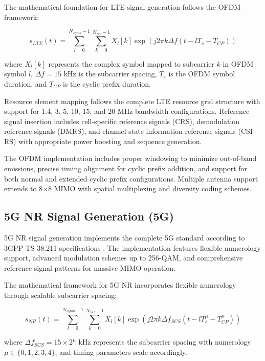 \documentclass[twocolumn]{article}
\begin{document}
The mathematical foundation for LTE signal generation follows the OFDM framework:

\begin{equation}
s_{LTE}(t) = \sum_{l=0}^{N_{symb}-1} \sum_{k=0}^{N_{SC}-1} X_l[k] \exp\left(j2\pi k \Delta f (t-lT_s-T_{CP})\right)
\end{equation}

where $X_l[k]$ represents the complex symbol mapped to subcarrier $k$ in OFDM symbol $l$, $\Delta f = 15$ kHz is the subcarrier spacing, $T_s$ is the OFDM symbol duration, and $T_{CP}$ is the cyclic prefix duration.

Resource element mapping follows the complete LTE resource grid structure with support for 1.4, 3, 5, 10, 15, and 20 MHz bandwidth configurations. Reference signal insertion includes cell-specific reference signals (CRS), demodulation reference signals (DMRS), and channel state information reference signals (CSI-RS) with appropriate power boosting and sequence generation.

The OFDM implementation includes proper windowing to minimize out-of-band emissions, precise timing alignment for cyclic prefix addition, and support for both normal and extended cyclic prefix configurations. Multiple antenna support extends to 8$\times$8 MIMO with spatial multiplexing and diversity coding schemes.

\subsection{5G NR Signal Generation (5G)}

5G NR signal generation implements the complete 5G standard according to 3GPP TS 38.211 specifications \cite{3gpp2020ts38211}. The implementation features flexible numerology support, advanced modulation schemes up to 256-QAM, and comprehensive reference signal patterns for massive MIMO operation.

The mathematical framework for 5G NR incorporates flexible numerology through scalable subcarrier spacing:

\begin{equation}
s_{NR}(t) = \sum_{l=0}^{N_{symb}-1} \sum_{k=0}^{N_{SC}-1} X_l[k] \exp\left(j2\pi k \Delta f_{SCS} (t-lT_s^{\mu}-T_{CP}^{\mu})\right)
\end{equation}

where $\Delta f_{SCS} = 15 \times 2^\mu$ kHz represents the subcarrier spacing with numerology $\mu \in \{0,1,2,3,4\}$, and timing parameters scale accordingly.
\end{document}
